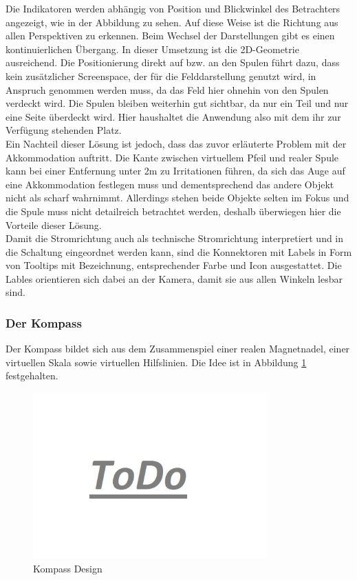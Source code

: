 Die Indikatoren werden abhängig von Position und Blickwinkel des Betrachters angezeigt, wie in der Abbildung zu sehen. Auf diese Weise ist die Richtung aus allen Perspektiven zu erkennen. Beim Wechsel der Darstellungen gibt es einen kontinuierlichen Übergang. In dieser Umsetzung ist die 2D-Geometrie ausreichend. Die Positionierung direkt auf bzw. an den Spulen führt dazu, dass kein zusätzlicher Screenspace, der für die Felddarstellung genutzt wird, in Anspruch genommen werden muss, da das Feld hier ohnehin von den Spulen verdeckt wird. Die Spulen bleiben weiterhin gut sichtbar, da nur ein Teil und nur eine Seite überdeckt wird. Hier haushaltet die Anwendung also mit dem ihr zur Verfügung stehenden Platz.\\

Ein Nachteil dieser Lösung ist jedoch, dass das zuvor erläuterte Problem mit der Akkommodation auftritt. Die Kante zwischen virtuellem Pfeil und realer Spule kann bei einer Entfernung unter 2m zu Irritationen führen, da sich das Auge auf eine Akkommodation festlegen muss und dementsprechend das andere Objekt nicht als scharf wahrnimmt. Allerdings stehen beide Objekte selten im Fokus und die Spule muss nicht detailreich betrachtet werden, deshalb überwiegen hier die Vorteile dieser Lösung.\\

Damit die Stromrichtung auch als technische Stromrichtung interpretiert und in die Schaltung eingeordnet werden kann, sind die Konnektoren mit Labels in Form von Tooltips mit Bezeichnung, entsprechender Farbe und Icon ausgestattet. Die Lables orientieren sich dabei an der Kamera, damit sie aus allen Winkeln lesbar sind.\\

\subsubsection{Der Kompass} 
\label{sec-4-2-4}
Der Kompass bildet sich aus dem Zusammenspiel einer realen Magnetnadel, einer virtuellen Skala sowie virtuellen Hilfslinien. Die Idee ist in Abbildung \ref{img:compass-design} festgehalten.

\begin{figure}[h!]
	\centering
	\includegraphics[width=0.8\textwidth]{images/todo.jpg}
	\caption{Kompass Design}
	\label{img:compass-design}
\end{figure}

